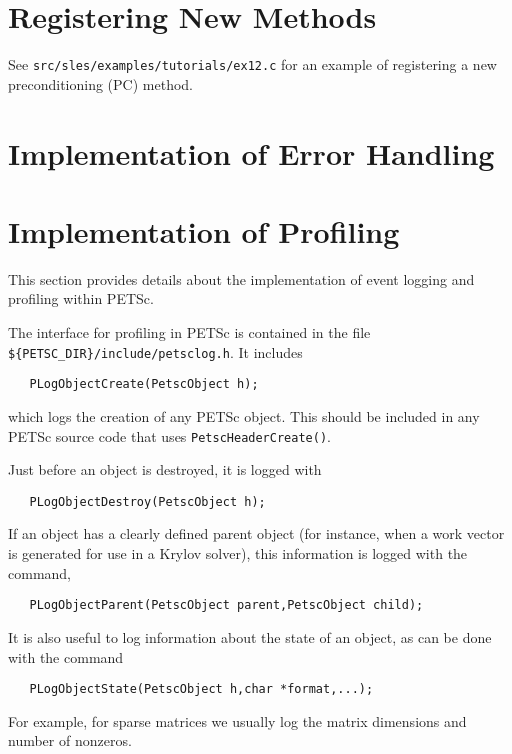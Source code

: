 \chapter{Registering New Methods}

See {\tt src/sles/examples/tutorials/ex12.c} for an example of registering a new
preconditioning (PC) method.

\chapter{Implementation of Error Handling}

\chapter{Implementation of Profiling}
\label{sec:profimpl}

This section provides details about the implementation of event
logging and profiling within PETSc.   

The interface for profiling in PETSc is contained in the file 
{\tt \$\{PETSC\_DIR\}/include/petsclog.h}. It includes 
\begin{verbatim}
   PLogObjectCreate(PetscObject h);
\end{verbatim}
which logs the creation of any PETSc object. This should be included in 
any PETSc source code that uses {\tt PetscHeaderCreate()}. 

Just before an object is destroyed, it is logged
with  
\begin{verbatim}
   PLogObjectDestroy(PetscObject h);
\end{verbatim}

If an object has a clearly defined parent object (for instance, when 
a work vector is generated for use in a Krylov solver), this information
is logged with the command, 
\begin{verbatim}
   PLogObjectParent(PetscObject parent,PetscObject child);
\end{verbatim}
It is also useful to log information about the state of an object, as can
be done with the command 
\begin{verbatim}
   PLogObjectState(PetscObject h,char *format,...);
\end{verbatim}
For example, for sparse matrices we usually log the matrix 
dimensions and number of nonzeros.

